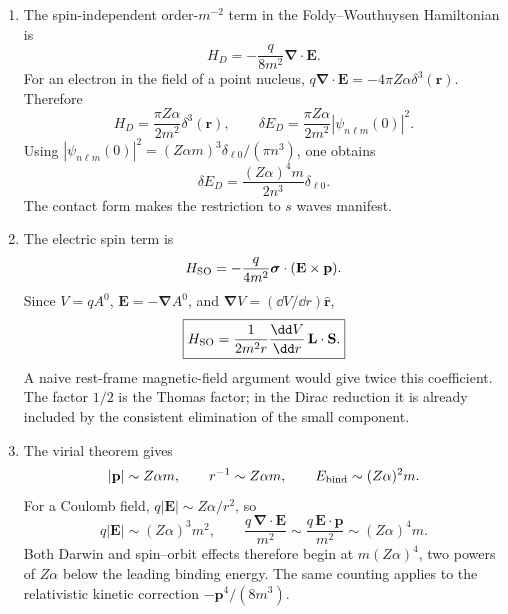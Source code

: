 \begin{enumerate}
\begin{enumerate}
\item
The spin-independent order-\(m^{-2}\) term in the
Foldy--Wouthuysen Hamiltonian is
\[
 H_D=-\frac{q}{8m^2}\boldsymbol\nabla\cdot\mathbf E.
\]
For an electron in the field of a point nucleus,
\(q\boldsymbol\nabla\cdot\mathbf E=-4\pi Z\alpha\delta^3(\mathbf r)\).
Therefore
\[
 H_D=\frac{\pi Z\alpha}{2m^2}\delta^3(\mathbf r),\qquad
 \delta E_D=\frac{\pi Z\alpha}{2m^2}|\psi_{n\ell m}(0)|^2.
\]
Using
\(|\psi_{n\ell m}(0)|^2=(Z\alpha m)^3
\delta_{\ell0}/(\pi n^3)\), one obtains
\[
 \boxed{\delta E_D=\frac{(Z\alpha)^4m}{2n^3}\delta_{\ell0}.}
\]
The contact form makes the restriction to \(s\) waves manifest.
\item
The electric spin term is
\[
 H_{\rm SO}=-\frac{q}{4m^2}
 \boldsymbol\sigma\cdot(\mathbf E\times\mathbf p).
\]
Since \(V=qA^0\), \(\mathbf E=-\boldsymbol\nabla A^0\), and
\(\boldsymbol\nabla V=(\dd V/\dd r)\widehat{\mathbf r}\),
\[
 \boxed{H_{\rm SO}=
 \frac{1}{2m^2r}\frac{\dd V}{\dd r}\,\mathbf L\cdot\mathbf S .}
\]
A naive rest-frame magnetic-field argument would give twice this
coefficient.  The factor \(1/2\) is the Thomas factor; in the Dirac
reduction it is already included by the consistent elimination of the
small component.
\item
The virial theorem gives
\[
 |\mathbf p|\sim Z\alpha m,\qquad
 r^{-1}\sim Z\alpha m,\qquad
 E_{\rm bind}\sim (Z\alpha)^2m .
\]
For a Coulomb field, \(q|\mathbf E|\sim Z\alpha/r^2\), so
\[
 q|\mathbf E|\sim(Z\alpha)^3m^2,\qquad
 \frac{q\,\boldsymbol\nabla\cdot\mathbf E}{m^2}
 \sim\frac{q\,\mathbf E\cdot\mathbf p}{m^2}
 \sim(Z\alpha)^4m .
\]
Both Darwin and spin--orbit effects therefore begin at
\(\boxed{m(Z\alpha)^4}\), two powers of \(Z\alpha\) below the leading
binding energy.  The same counting applies to the relativistic kinetic
correction \(-\mathbf p^4/(8m^3)\).
\end{enumerate}


\end{enumerate}
